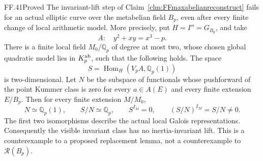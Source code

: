 \begin{claim}{FF.41}{Proved}\label{clm:FFmetabelianbarrier}
The invariant-lift step of
Claim~\ref{clm:FFmaxabelianreconstruct}
fails for an actual elliptic curve over
the metabelian field \(B_p\), even
after every finite change of local
arithmetic model. More precisely, put
\(H=I''=G_{B_p}\), and take
\[
                  A:\quad y^2+xy=x^3-p.
                                                        \tag{FF.41.1}
\]
There is a finite local field
\(M_0/\mathbb Q_p\) of degree at most
two, whose chosen global quadratic
model lies in \(K_p^{\rm ab}\), such
that the following holds. The space
\[
 S=\operatorname{Hom}_{H}
          (V_pA,\mathbb Q_p(1))
                                                        \tag{FF.41.2}
\]
is two-dimensional. Let \(N\) be the
subspace of functionals whose pushforward
of the point Kummer class is zero for
every \(a\in A(E)\) and every finite
extension \(E/B_p\). Then for every
finite extension \(M/M_0\),
\[
       N\simeq\mathbb Q_p(1),\qquad
       S/N\simeq\mathbb Q_p,\qquad
       S^{I_M}=0,\qquad
       (S/N)^{I_M}=S/N\ne0.
                                                        \tag{FF.41.3}
\]
The first two isomorphisms describe
the actual local Galois representations.
Consequently the visible invariant
class has no inertia-invariant lift.
This is a counterexample to a proposed
replacement lemma, not a counterexample
to \(\mathcal R(B_p)\).
\end{claim}
